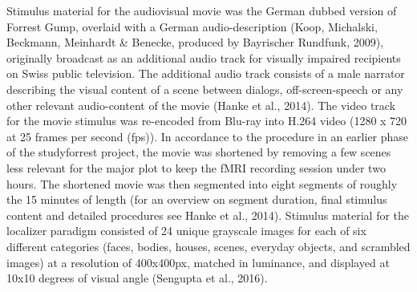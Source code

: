 \documentclass[a4paper, 11pt]{scrreprt}
\begin{document}
Stimulus material for the audiovisual movie was the German dubbed version of Forrest Gump, overlaid with a German audio-description (Koop, Michalski, Beckmann, Meinhardt \& Benecke, produced by Bayrischer Rundfunk, 2009), originally broadcast as an additional audio track for visually impaired recipients on Swiss public television. The additional audio track consists of a male narrator describing the visual content of a scene between dialogs, off-screen-speech or any other relevant audio-content of the movie (Hanke et al., 2014). The video track for the movie stimulus was re-encoded from Blu-ray into H.264 video (1280 x 720 at 25 frames per second (fps)). In accordance to the procedure in an earlier phase of the studyforrest project, the movie was shortened by removing a few scenes less relevant for the major plot to keep the fMRI recording session under two hours. The shortened movie was then segmented into eight segments of roughly the 15 minutes of length (for an overview on segment duration, final stimulus content and detailed procedures see Hanke et al., 2014). Stimulus material for the localizer paradigm consisted of 24 unique grayscale images for each of six different categories (faces, bodies, houses, scenes, everyday objects, and scrambled images) at a resolution of 400x400px, matched in luminance, and displayed at 10x10 degrees of visual angle (Sengupta et al., 2016).
\end{document}
